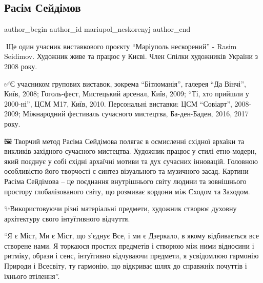  
 
 
 
 

\subsection{Расім Сейдімов}
\label{sec:20_08_2023.fb.mariupol_neskorenyj.1.rasim_sejdimov}

\ifcmt
 author_begin
   author_id mariupol_neskorenyj
 author_end
\fi

📍Ще один учасник виставкового проєкту \enquote{Маріуполь нескорений} - Rasim Seidimov.
Художник живе та працює у Києві. Член Спілки художників України з 2008 року.

✅️Є учасником групових виставок, зокрема \enquote{Бітломанія}, галерея \enquote{Да Вінчі},
Київ, 2008; Гоголь-фест, Мистецький арсенал, Київ, 2009; \enquote{Ті, хто прийшли у
2000-ні}, ЦСМ М17, Київ, 2010. Персональні виставки: ЦСМ \enquote{Совіарт}, 2008-2009;
Міжнародний фестиваль сучасного мистецтва, Ба\hyp{}ден-Баден, 2016, 2017 року.

🖼 Творчий метод Расіма Сейдімова полягає в осмисленні східної архаїки та
викликів західного сучасного мистецтва. Художник працює у стилі  етно-модерн,
який поєднує у собі східні архаїчні мотиви та дух сучасних інновацій. Головною
особливістю його творчості є синтез візуального та музичного засад. Картини
Расіма Сейдімова – це поєднання внутрішнього світу людини та зовнішнього
простору глобалізованого світу, що розмиває кордони між Сходом та Заходом.

✨️Використовуючи різні матеріальні предмети, художник створює духовну
архітектуру свого інтуїтивного відчуття. 

\enquote{Я є Міст, Ми є Міст, що з'єднує Все, і ми є Дзеркало, в якому  відбивається
все створене нами. Я торкаюся простих предметів і  створюю між ними відносини і
ритміку, образи і сенс, інтуїтивно відчуваючи предмети, я усвідомлюю гармонію
Природи і Всесвіту, ту  гармонію, що відкриває шлях до справжніх почуттів і
їхнього втілення}.🎨

